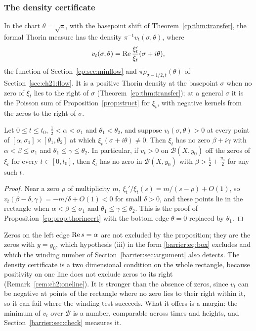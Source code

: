 \subsubsection{The density certificate}

In the chart $\theta=\sqrt z$, with the basepoint shift of Theorem~\ref{cp:thm:transfer}, the formal Thorin measure has the density $\pi^{-1}v_t(\sigma,\theta)$, where
\[
v_t(\sigma,\theta)=\operatorname{Re}\frac{\xi_t'}{\xi_t}(\sigma+i\theta),
\]
the function of Section~\ref{cp:sec:minflow} and $\pi\rho_{\sigma-1/2,t}(\theta)$ of Section~\ref{sec:ch21:flow}. It is a positive Thorin density at the basepoint $\sigma$ when no zero of $\xi_t$ lies to the right of $\sigma$ (Theorem~\ref{cp:thm:transfer}); at a general $\sigma$ it is the Poisson sum of Proposition~\ref{prop:struct} for $\xi_t$, with negative kernels from the zeros to the right of $\sigma$.

\begin{proposition}\label{barrier:prop:density}
Let $0\le t\le t_0$, $\frac12<\alpha<\sigma_1$ and $\theta_1<\theta_2$, and suppose $v_t(\sigma,\theta)>0$ at every point of $[\alpha,\sigma_1]\times[\theta_1,\theta_2]$ at which $\xi_t(\sigma+i\theta)\ne0$. Then $\xi_t$ has no zero $\beta+i\gamma$ with $\alpha<\beta\le\sigma_1$ and $\theta_1\le\gamma\le\theta_2$. In particular, if $v_t>0$ on $\mathcal B(X,y_0)$ off the zeros of $\xi_t$ for every $t\in[0,t_0]$, then $\xi_t$ has no zero in $\mathcal B(X,y_0)$ with $\beta>\frac12+\frac{y_0}2$ for any such $t$.
\end{proposition}

\begin{proof}
Near a zero $\rho$ of multiplicity $m$, $\xi_t'/\xi_t(s)=m/(s-\rho)+O(1)$, so $v_t(\beta-\delta,\gamma)=-m/\delta+O(1)<0$ for small $\delta>0$, and these points lie in the rectangle when $\alpha<\beta\le\sigma_1$ and $\theta_1\le\gamma\le\theta_2$. This is the proof of Proposition~\ref{cp:prop:thorincert} with the bottom edge $\theta=0$ replaced by $\theta_1$.
\end{proof}

Zeros on the left edge $\operatorname{Re} s=\alpha$ are not excluded by the proposition; they are the zeros with $y=y_0$, which hypothesis (iii) in the form \eqref{barrier:eq:box} excludes and which the winding number of Section~\ref{barrier:sec:argument} also detects. The density certificate is a two dimensional condition on the whole rectangle, because positivity on one line does not exclude zeros to its right (Remark~\ref{rem:ch2:oneline}). It is stronger than the absence of zeros, since $v_t$ can be negative at points of the rectangle where no zero lies to their right within it, so it can fail where the winding test succeeds. What it offers is a margin: the minimum of $v_t$ over $\mathcal B$ is a number, comparable across times and heights, and Section~\ref{barrier:sec:check} measures it.

